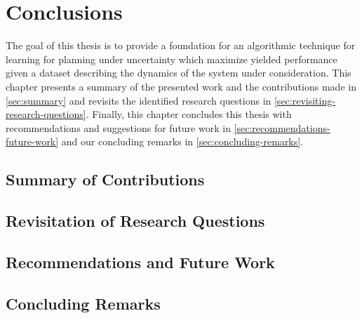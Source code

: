 \chapter{Conclusions}
\label{ch:conclusions}

The goal of this thesis is to provide a foundation for an algorithmic technique for learning  for planning under uncertainty which maximize yielded performance given a dataset describing the dynamics of the system under consideration.
This chapter presents a summary of the presented work and the contributions made in \autoref{sec:summary} and revisits the identified research questions in \autoref{sec:revisiting-research-questions}.
Finally, this chapter concludes this thesis with recommendations and suggestions for future work in \autoref{sec:recommendations-future-work} and our concluding remarks in \autoref{sec:concluding-remarks}.


\section{Summary of Contributions}
\label{sec:summary}


\section{Revisitation of Research Questions}
\label{sec:revisiting-research-questions}


\section{Recommendations and Future Work}
\label{sec:recommendations-future-work}

% 

\section{Concluding Remarks}
\label{sec:concluding-remarks}

%